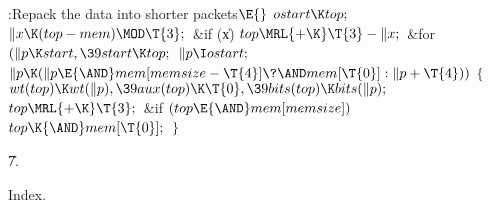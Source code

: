 \B{}:Repack the data into shorter packets\X${}\E{}$\6
$\\{ostart}\K\\{top};{}$\6
${}\|x\K(\\{top}-\\{mem})\MOD\T{3};{}$\6
\&{if} (\|x)\1\5
${}\\{top}\MRL{+{\K}}\T{3}-\|x;{}$\2\6
\&{for} ${}(\|p\K\\{start},\39\\{start}\K\\{top};{}$ ${}\|p\I\\{ostart};{}$ ${}%
\|p\K(\|p\E{\AND}\\{mem}[\\{memsize}-\T{4}]\?{\AND}\\{mem}[\T{0}]:\|p+%
\T{4})){}$\5
${}\{{}$\1\6
${}\\{wt}(\\{top})\K\\{wt}(\|p),\39\\{aux}(\\{top})\K\T{0},\39\\{bits}(\\{top})%
\K\\{bits}(\|p);{}$\6
${}\\{top}\MRL{+{\K}}\T{3};{}$\6
\&{if} ${}(\\{top}\E{\AND}\\{mem}[\\{memsize}]){}$\1\5
${}\\{top}\K{\AND}\\{mem}[\T{0}];{}$\2\6
\4${}\}{}$\2\par
\U7.\fi

Index.
\fi

\inx
\fin
\con
